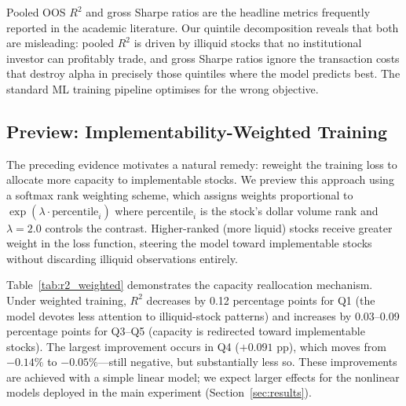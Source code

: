 \documentclass[a4paper,12pt,final]{article}
\begin{document}
Pooled OOS $R^2$ and gross Sharpe ratios are the headline metrics frequently reported in the academic literature. Our quintile decomposition reveals that both are misleading: pooled $R^2$ is driven by illiquid stocks that no institutional investor can profitably trade, and gross Sharpe ratios ignore the transaction costs that destroy alpha in precisely those quintiles where the model predicts best. The standard ML training pipeline optimises for the wrong objective.

\subsection{Preview: Implementability-Weighted Training}
\label{subsec:preview}

The preceding evidence motivates a natural remedy: reweight the training loss to allocate more capacity to implementable stocks. We preview this approach using a softmax rank weighting scheme, which assigns weights proportional to $\exp(\lambda \cdot \text{percentile}_i)$ where $\text{percentile}_i$ is the stock's dollar volume rank and $\lambda = 2.0$ controls the contrast. Higher-ranked (more liquid) stocks receive greater weight in the loss function, steering the model toward implementable stocks without discarding illiquid observations entirely.



Table~\ref{tab:r2_weighted} demonstrates the capacity reallocation mechanism. Under weighted training, $R^2$ decreases by 0.12 percentage points for Q1 (the model devotes less attention to illiquid-stock patterns) and increases by 0.03--0.09 percentage points for Q3--Q5 (capacity is redirected toward implementable stocks). The largest improvement occurs in Q4 ($+0.091$ pp), which moves from $-0.14\%$ to $-0.05\%$---still negative, but substantially less so. These improvements are achieved with a simple linear model; we expect larger effects for the nonlinear models deployed in the main experiment (Section~\ref{sec:results}).

\end{document}
